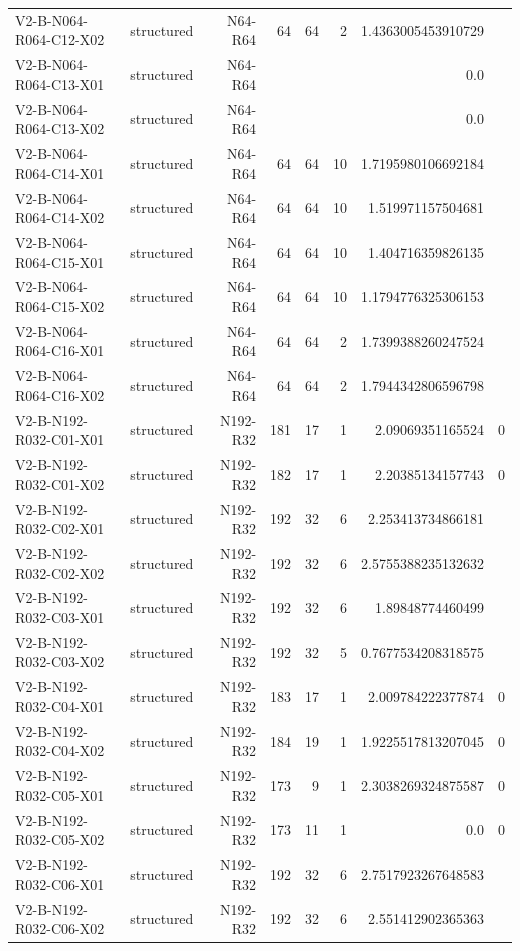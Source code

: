 {\begin{longtable}{lrrrrrrr}
V2-B-N064-R064-C12-X02 & structured & N64-R64 & 64 & 64 & 2 & 1.4363005453910729 &  \\
V2-B-N064-R064-C13-X01 & structured & N64-R64 &  &  &  & 0.0 &  \\
V2-B-N064-R064-C13-X02 & structured & N64-R64 &  &  &  & 0.0 &  \\
V2-B-N064-R064-C14-X01 & structured & N64-R64 & 64 & 64 & 10 & 1.7195980106692184 &  \\
V2-B-N064-R064-C14-X02 & structured & N64-R64 & 64 & 64 & 10 & 1.519971157504681 &  \\
V2-B-N064-R064-C15-X01 & structured & N64-R64 & 64 & 64 & 10 & 1.404716359826135 &  \\
V2-B-N064-R064-C15-X02 & structured & N64-R64 & 64 & 64 & 10 & 1.1794776325306153 &  \\
V2-B-N064-R064-C16-X01 & structured & N64-R64 & 64 & 64 & 2 & 1.7399388260247524 &  \\
V2-B-N064-R064-C16-X02 & structured & N64-R64 & 64 & 64 & 2 & 1.7944342806596798 &  \\
V2-B-N192-R032-C01-X01 & structured & N192-R32 & 181 & 17 & 1 & 2.09069351165524 & 0 \\
V2-B-N192-R032-C01-X02 & structured & N192-R32 & 182 & 17 & 1 & 2.20385134157743 & 0 \\
V2-B-N192-R032-C02-X01 & structured & N192-R32 & 192 & 32 & 6 & 2.253413734866181 &  \\
V2-B-N192-R032-C02-X02 & structured & N192-R32 & 192 & 32 & 6 & 2.5755388235132632 &  \\
V2-B-N192-R032-C03-X01 & structured & N192-R32 & 192 & 32 & 6 & 1.89848774460499 &  \\
V2-B-N192-R032-C03-X02 & structured & N192-R32 & 192 & 32 & 5 & 0.7677534208318575 &  \\
V2-B-N192-R032-C04-X01 & structured & N192-R32 & 183 & 17 & 1 & 2.009784222377874 & 0 \\
V2-B-N192-R032-C04-X02 & structured & N192-R32 & 184 & 19 & 1 & 1.9225517813207045 & 0 \\
V2-B-N192-R032-C05-X01 & structured & N192-R32 & 173 & 9 & 1 & 2.3038269324875587 & 0 \\
V2-B-N192-R032-C05-X02 & structured & N192-R32 & 173 & 11 & 1 & 0.0 & 0 \\
V2-B-N192-R032-C06-X01 & structured & N192-R32 & 192 & 32 & 6 & 2.7517923267648583 &  \\
V2-B-N192-R032-C06-X02 & structured & N192-R32 & 192 & 32 & 6 & 2.551412902365363 &  \\

\end{longtable}}
